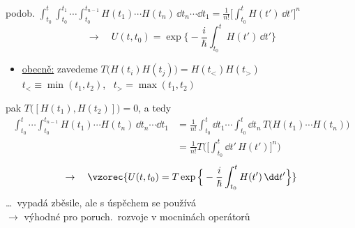 podob. \quad
$\displaystyle\int_{t_0}^{t}\int_{t_0}^{t_1}\!\!\cdots\int_{t_0}^{t_{n-1}}H(t_1)\cdots H(t_n)\,\dd t_n\cdots\dd t_1 = \frac{1}{n!}\Big[\int_{t_0}^{t}H(t')\,\dd t'\Big]^n$
\[
  \to\quad U(t,t_0) = \exp\Big\{-\frac{i}{\hbar}\int_{t_0}^{t}H(t')\,\dd t'\Big\}
\]

\begin{itemize}
  \item \underline{obecně:} zavedeme  \quad $T\big(H(t_i)H(t_j)\big) = H(t_<)H(t_>)$ \\
        \hspace*{6cm} $t_< \equiv \min(t_1,t_2)$, \ $t_> = \max(t_1,t_2)$
\end{itemize}
pak \quad $T\big([H(t_1),H(t_2)]\big) = 0$, a tedy
\begin{align*}
  \int_{t_0}^{t}\cdots\int_{t_0}^{t_{n-1}}H(t_1)\cdots H(t_n)\,\dd t_n\cdots\dd t_1
  &= \frac{1}{n!}\int_{t_0}^{t}\dd t_1\cdots\int_{t_0}^{t}\dd t_n\,T\big(H(t_1)\cdots H(t_n)\big) \\
  &= \frac{1}{n!}T\Big(\Big[\int_{t_0}^{t}\dd t'\,H(t')\Big]^n\Big)
\end{align*}
\[
  \to\quad \vzorec{U(t,t_0) = T\exp\Big\{-\frac{i}{\hbar}\int_{t_0}^{t}H(t')\,\dd t'\Big\}}
\]
\dots\ vypadá zběsile, ale s úspěchem se používá \\
\quad $\to$ výhodné pro poruch.\ rozvoje v mocninách operátorů
